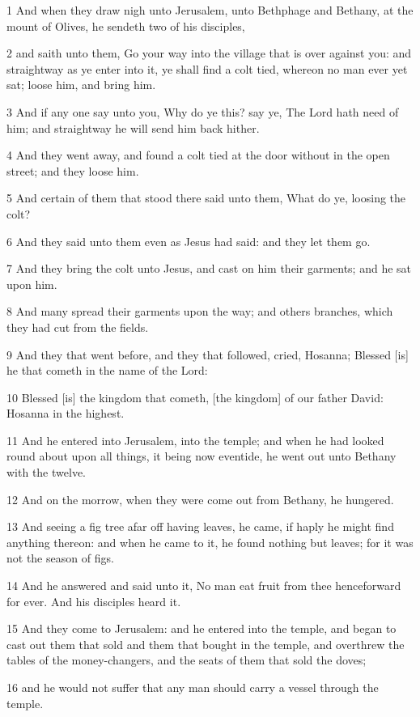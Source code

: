 \par 1 And when they draw nigh unto Jerusalem, unto Bethphage and Bethany, at the mount of Olives, he sendeth two of his disciples,
\par 2 and saith unto them, Go your way into the village that is over against you: and straightway as ye enter into it, ye shall find a colt tied, whereon no man ever yet sat; loose him, and bring him.
\par 3 And if any one say unto you, Why do ye this? say ye, The Lord hath need of him; and straightway he will send him back hither.
\par 4 And they went away, and found a colt tied at the door without in the open street; and they loose him.
\par 5 And certain of them that stood there said unto them, What do ye, loosing the colt?
\par 6 And they said unto them even as Jesus had said: and they let them go.
\par 7 And they bring the colt unto Jesus, and cast on him their garments; and he sat upon him.
\par 8 And many spread their garments upon the way; and others branches, which they had cut from the fields.
\par 9 And they that went before, and they that followed, cried, Hosanna; Blessed [is] he that cometh in the name of the Lord:
\par 10 Blessed [is] the kingdom that cometh, [the kingdom] of our father David: Hosanna in the highest.
\par 11 And he entered into Jerusalem, into the temple; and when he had looked round about upon all things, it being now eventide, he went out unto Bethany with the twelve.
\par 12 And on the morrow, when they were come out from Bethany, he hungered.
\par 13 And seeing a fig tree afar off having leaves, he came, if haply he might find anything thereon: and when he came to it, he found nothing but leaves; for it was not the season of figs.
\par 14 And he answered and said unto it, No man eat fruit from thee henceforward for ever. And his disciples heard it.
\par 15 And they come to Jerusalem: and he entered into the temple, and began to cast out them that sold and them that bought in the temple, and overthrew the tables of the money-changers, and the seats of them that sold the doves;
\par 16 and he would not suffer that any man should carry a vessel through the temple.
